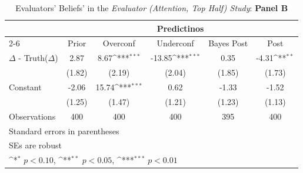 \begin{table}[htbp]\centering
\def\sym#1{\ifmmode^{#1}\else\(^{#1}\)\fi}
\caption{Evaluators' Beliefs' in the \textit{Evaluator (Attention, Top Half) Study}: \textbf{Panel B}}
\begin{tabular}{l*{5}{c}}
\hline\hline
                &\multicolumn{5}{c}{Predictinos}                                                               \\\cmidrule(lr){2-6}
                &\multicolumn{1}{c}{Prior}&\multicolumn{1}{c}{Overconf}&\multicolumn{1}{c}{Underconf}&\multicolumn{1}{c}{Bayes Post}&\multicolumn{1}{c}{Post}\\
\hline
$\Delta$ - Truth($\Delta$)&     2.87         &     8.67\sym{***}&   -13.85\sym{***}&     0.35         &    -4.31\sym{**} \\
                &   (1.82)         &   (2.19)         &   (2.04)         &   (1.85)         &   (1.73)         \\
Constant        &    -2.06         &    15.74\sym{***}&     0.62         &    -1.33         &    -1.52         \\
                &   (1.25)         &   (1.47)         &   (1.21)         &   (1.23)         &   (1.13)         \\
\hline
Observations    &      400         &      400         &      400         &      395         &      400         \\
\hline\hline
\multicolumn{6}{l}{\footnotesize Standard errors in parentheses}\\
\multicolumn{6}{l}{\footnotesize SEs are robust}\\
\multicolumn{6}{l}{\footnotesize \sym{*} \(p<0.10\), \sym{**} \(p<0.05\), \sym{***} \(p<0.01\)}\\
\end{tabular}
\end{table}
